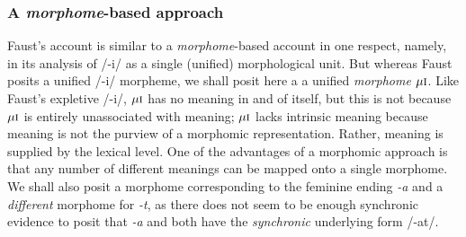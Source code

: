 \subsubsection{A \emph{morphome}-based approach}
Faust's account is similar to a \emph{morphome}-based account
in one respect, namely, in its analysis of /-i/
as a single (unified) morphological unit. But whereas Faust posits a unified 
/-i/ morpheme, we shall posit here a 
a unified \emph{morphome} $\mu{\textsc{i}}$. Like Faust's expletive /-i/,
$\mu{\textsc{i}}$ has no meaning in and of itself, but this is not 
because $\mu{\textsc{i}}$ is entirely unassociated with meaning; 
$\mu{\textsc{i}}$ lacks intrinsic meaning because meaning is not the 
purview of a morphomic representation. Rather, meaning is supplied by 
the lexical level. One of the advantages of a morphomic approach
is that any number of different meanings can be mapped onto a single 
morphome. We shall also posit a morphome corresponding to the 
feminine ending \textit{-a} and a \emph{different} morphome for 
\textit{-t}, as there does not seem to be enough synchronic evidence to posit that 
\textit{-a} and  both have the \emph{synchronic} 
underlying form /-at/.
